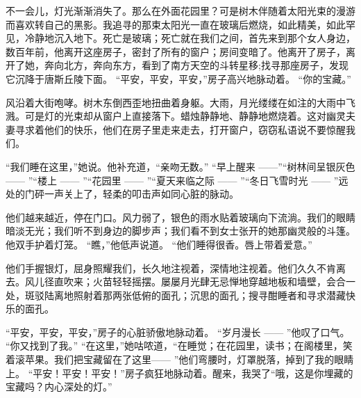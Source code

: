 { 	不一会儿，灯光渐渐消失了。那么在外面花园里？可是树木伴随着太阳光束的漫游而喜欢转自己的黑影。我追寻的那束太阳光一直在玻璃后燃烧，如此精美，如此罕见，冷静地沉入地下。死亡是玻璃；死亡就在我们之间，首先来到那个女人身边，数百年前，他离开这座房子，密封了所有的窗户；房间变暗了。他离开了房子，离开了她，奔向北方，奔向东方，看到了南方天空的斗转星移;找寻那座房子，发现它沉降于唐斯丘陵下面。 “平安，平安，平安，”房子高兴地脉动着。 “你的宝藏。”
 	
 	风沿着大街咆哮。树木东倒西歪地扭曲着身躯。大雨，月光缕缕在如注的大雨中飞溅。可是灯的光束却从窗户上直接落下。蜡烛静静地、静静地燃烧着。这对幽灵夫妻寻求着他们的快乐，他们在房子里走来走去，打开窗户，窃窃私语说不要惊醒我们。
 	
 	“我们睡在这里，”她说。他补充道，“亲吻无数。” “早上醒来 ——”“树林间呈银灰色 —— ”“楼上 —— ”“花园里 —— ”“夏天来临之际 —— ”“冬日飞雪时光 —— ”远处的门砰一声关上了，轻柔的叩击声如同心脏的脉动。
 	
 	他们越来越近，停在门口。风力弱了，银色的雨水贴着玻璃向下流淌。我们的眼睛暗淡无光；我们听不到身边的脚步声；我们看不到女士张开的她那幽灵般的斗篷。他双手护着灯笼。 “瞧，”他低声说道。 “他们睡得很香。唇上带着爱意。”
 	
 	他们手握银灯，屈身照耀我们，长久地注视着，深情地注视着。他们久久不肯离去。风儿径直吹来；火苗轻轻摇摆。屡屡月光肆无忌惮地穿越地板和墙壁，会合一处，斑驳陆离地照射着那两张低俯的面孔；沉思的面孔；搜寻酣睡者和寻求潜藏快乐的面孔。
 	
 	“平安，平安，平安，”房子的心脏骄傲地脉动着。 “岁月漫长 —— ”他叹了口气。 “你又找到了我。” “在这里，”她咕哝道，“在睡觉；在花园里，读书；在阁楼里，笑着滚苹果。我们把宝藏留在了这里—— ”他们弯腰时，灯罩脱落，掉到了我的眼睛上。 “平安！平安！平安！”房子疯狂地脉动着。醒来，我哭了“哦，这是你埋藏的宝藏吗？内心深处的灯。”}
 
